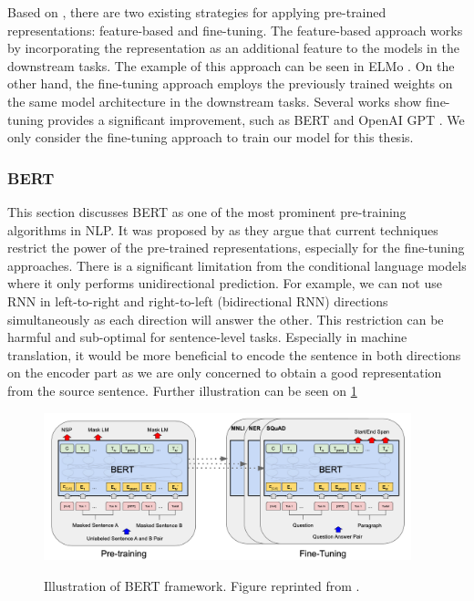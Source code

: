 Based on \cite{ruder2019transfer}, there are two existing strategies for applying pre-trained representations: feature-based and fine-tuning. The feature-based approach works by incorporating the representation as an additional feature to the models in the downstream tasks. The example of this approach can be seen in ELMo \cite{Peters2018DeepCW}. On the other hand, the fine-tuning approach employs the previously trained weights on the same model architecture in the downstream tasks. Several works show fine-tuning provides a significant improvement, such as BERT \cite{devlin2018bert} and OpenAI GPT \cite{Radford2018ImprovingLU}. We only consider the fine-tuning approach to train our model for this thesis.

\subsubsection{BERT}
This section discusses BERT as one of the most prominent pre-training algorithms in NLP. It was proposed by \cite{devlin2018bert} as they argue that current techniques restrict the power of the pre-trained representations, especially for the fine-tuning approaches. There is a significant limitation from the conditional language models where it only performs unidirectional prediction. For example, we can not use RNN in left-to-right and right-to-left (bidirectional RNN) directions simultaneously as each direction will answer the other.
This restriction can be harmful and sub-optimal for sentence-level tasks. Especially in machine translation, it would be more beneficial to encode the sentence in both directions on the encoder part as we are only concerned to obtain a good representation from the source sentence.
Further illustration can be seen on \ref{img:bert}

\begin{figure}[h]
    {\includegraphics[width=0.95\textwidth]{img/bert.png}}
    \centering
    \caption{Illustration of BERT framework. Figure reprinted from \cite{devlin2018bert}.}
    \label{img:bert}
\end{figure}


